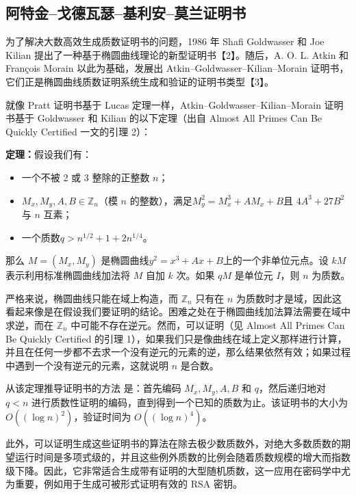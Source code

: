 \subsection{阿特金–戈德瓦瑟–基利安–莫兰证明书}
为了解决大数高效生成质数证明书的问题，1986 年 Shafi Goldwasser 和 Joe Kilian 提出了一种基于椭圆曲线理论的新型证明书【2】。随后，A. O. L. Atkin 和 François Morain 以此为基础，发展出 Atkin–Goldwasser–Kilian–Morain 证明书，它们正是椭圆曲线质数证明系统生成和验证的证明书类型【3】。

就像 Pratt 证明书基于 Lucas 定理一样，Atkin–Goldwasser–Kilian–Morain 证明书基于 Goldwasser 和 Kilian 的以下定理（出自 Almost All Primes Can Be Quickly Certified 一文的引理 2）：

\textbf{定理：}假设我们有：
\begin{itemize}
\item 一个不被 2 或 3 整除的正整数 $n$；
\item $M_x, M_y, A, B \in \mathbb{Z}_n$（模 $n$ 的整数），满足$M_y^2 = M_x^3 + A M_x + B$且 $4A^3 + 27B^2$ 与 $n$ 互素；
\item 一个质数$q > n^{1/2} + 1 + 2n^{1/4}$。
\end{itemize}
那么 $M = (M_x, M_y)$ 是椭圆曲线$y^2 = x^3 + A x + B$上的一个非单位元点。设 $kM$ 表示利用标准椭圆曲线加法将 $M$ 自加 $k$ 次。如果 $qM$ 是单位元 $I$，则 $n$ 为质数。

严格来说，椭圆曲线只能在域上构造，而 $\mathbb{Z}_n$ 只有在 $n$ 为质数时才是域，因此这看起来像是在假设我们要证明的结论。困难之处在于椭圆曲线加法算法需要在域中求逆，而在 $\mathbb{Z}_n$ 中可能不存在逆元。然而，可以证明（见 Almost All Primes Can Be Quickly Certified 的引理 1），如果我们只是像曲线在域上定义那样进行计算，并且在任何一步都不去求一个没有逆元的元素的逆，那么结果依然有效；如果过程中遇到一个没有逆元的元素，这就说明 $n$ 是合数。

从该定理推导证明书的方法 是：首先编码 $M_x, M_y, A, B$ 和 $q$，然后递归地对 $q < n$ 进行质数性证明的编码，直到得到一个已知的质数为止。该证明书的大小为 $O((\log n)^2)$，验证时间为 $O((\log n)^4)$。

此外，可以证明生成这些证明书的算法在除去极少数质数外，对绝大多数质数的期望运行时间是多项式级的，并且这些例外质数的比例会随着质数规模的增大而指数级下降。因此，它非常适合生成带有证明的大型随机质数，这一应用在密码学中尤为重要，例如用于生成可被形式证明有效的 RSA 密钥。
